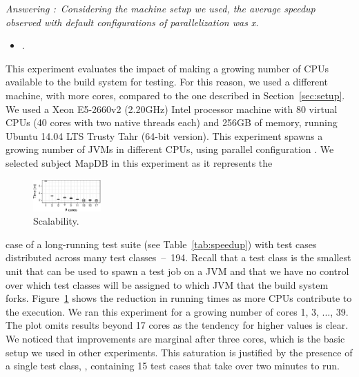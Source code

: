 \documentclass[10pt,journal,compsoc]{IEEEtran}
\begin{document}
\begin{mdframed}
 \noindent\textit{Answering \numRQSpeedupOne{}:}~\emph{Considering the
  machine setup we used, the average speedup observed with default
  configurations of parallelization was \avgSpeedup{}x.}
\end{mdframed}

\begin{itemize}
    \item \numRQSpeedupTwo{}. \textbf{\RQSpeedupTwo}
\end{itemize}

\newcommand{\subjectScalability}{MapDB}

This experiment evaluates the impact of making a growing number of
CPUs available to the build system for testing.  For this reason, we
used a different machine, with more cores, compared to the one described in
Section~\ref{sec:setup}.  We used a Xeon E5-2660v2 (2.20GHz) Intel
processor machine with 80 virtual CPUs (40 cores with two native
threads each) and 256GB of memory, running Ubuntu 14.04 LTS Trusty
Tahr (64-bit version). This experiment
spawns a growing number of JVMs in different CPUs, using parallel
configuration \emph{\ForkSeq{}}. We selected
subject \subjectScalability{} in this experiment as it represents the
\begin{figure}
  \includegraphics[width=0.23\textwidth]{R/scalability/scalability.pdf}
  \caption{\label{fig:scalability}Scalability.}
  \vspace{-4mm}
\end{figure}
case of a long-running test suite (see Table~\ref{tab:speedup}) with
test cases distributed across many test classes~--~194.  
Recall that a test class is the smallest unit that can be used to spawn a test job
on a JVM and that we have no control over which test classes will be
assigned to which JVM that the build system forks.
Figure~\ref{fig:scalability} shows the reduction in running times as
more CPUs contribute to the execution.
We ran this experiment for a growing number of cores 1, 3, ..., 39. 
The plot omits results beyond 17 cores as the tendency for higher
values is clear.
We noticed that improvements are marginal after three cores, which is
the basic setup we used in other experiments.
This saturation is justified by the presence of a single test class,
, containing 15 test cases that take over
two minutes to run.
\end{document}
